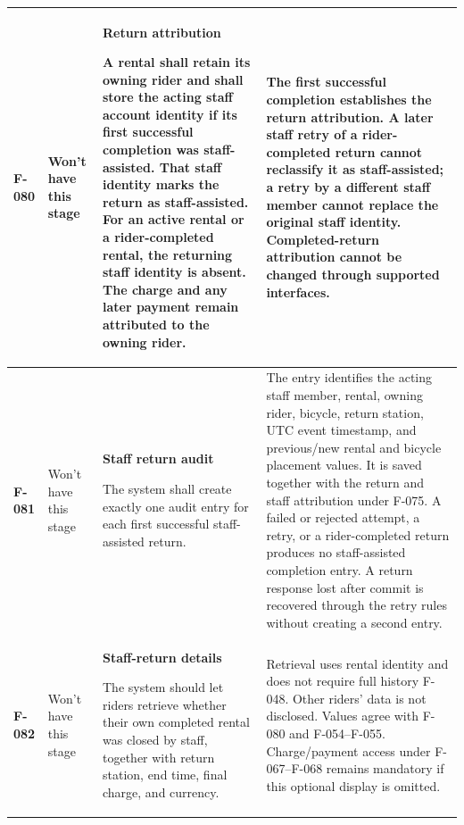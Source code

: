 \documentclass[10pt,a4paper,landscape]{article}
\newcommand{\reqtitle}[1]{{\fontsize{11}{13}\selectfont\bfseries #1}\par\nobreak\vspace{2pt}\noindent}
\begin{document}
\begin{longtable}{|C{27mm}|C{25mm}|L{79mm}|L{111mm}|}
\textbf{F-080} & Won't have this stage & \reqtitle{Return attribution}A rental shall retain its owning rider and shall store the acting staff account identity if its first successful completion was staff-assisted. That staff identity marks the return as staff-assisted. For an active rental or a rider-completed rental, the returning staff identity is absent. The charge and any later payment remain attributed to the owning rider. & The first successful completion establishes the return attribution. A later staff retry of a rider-completed return cannot reclassify it as staff-assisted; a retry by a different staff member cannot replace the original staff identity. Completed-return attribution cannot be changed through supported interfaces. \\\hline

\textbf{F-081} & Won't have this stage & \reqtitle{Staff return audit}The system shall create exactly one audit entry for each first successful staff-assisted return. & The entry identifies the acting staff member, rental, owning rider, bicycle, return station, UTC event timestamp, and previous/new rental and bicycle placement values. It is saved together with the return and staff attribution under F-075. A failed or rejected attempt, a retry, or a rider-completed return produces no staff-assisted completion entry. A return response lost after commit is recovered through the retry rules without creating a second entry. \\\hline

\textbf{F-082} & Won't have this stage & \reqtitle{Staff-return details}The system should let riders retrieve whether their own completed rental was closed by staff, together with return station, end time, final charge, and currency. & Retrieval uses rental identity and does not require full history F-048. Other riders' data is not disclosed. Values agree with F-080 and F-054–F-055. Charge/payment access under F-067–F-068 remains mandatory if this optional display is omitted. \\\hline
\end{longtable}
\endgroup

\end{document}
